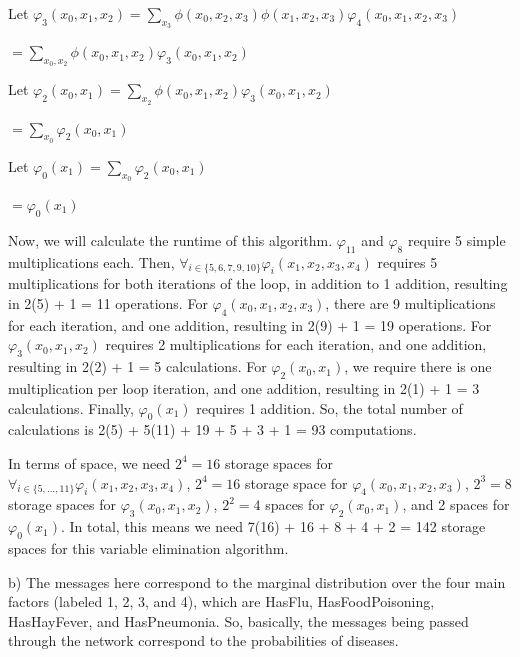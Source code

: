\documentclass[12pt]{article}
\begin{document}
Let $\varphi_3(x_0, x_1, x_2) = \sum_{x_3} \phi(x_0, x_2, x_3)\phi(x_1, x_2, x_3)\varphi_4(x_0, x_1, x_2, x_3)$

$= \sum_{x_0, x_2} \phi(x_0, x_1, x_2)\varphi_3(x_0, x_1, x_2)$

Let $\varphi_2(x_0, x_1) = \sum_{x_2} \phi(x_0, x_1, x_2)\varphi_3(x_0, x_1, x_2)$

$= \sum_{x_0} \varphi_2(x_0, x_1)$

Let $\varphi_0(x_1) = \sum_{x_0} \varphi_2(x_0, x_1)$

$= \varphi_0(x_1)$

Now, we will calculate the runtime of this algorithm. $\varphi_{11}$ and $\varphi_8$ require 5 simple multiplications each. Then, $\forall_{i \in \{5, 6, 7, 9, 10\}}\varphi_{i}(x_1, x_2, x_3, x_4)$ requires 5 multiplications for both iterations of the loop, in addition to 1 addition, resulting in 2(5) + 1 = 11 operations. For $\varphi_4(x_0, x_1, x_2, x_3)$, there are 9 multiplications for each iteration, and one addition, resulting in 2(9) + 1 = 19 operations. For $\varphi_3(x_0, x_1, x_2)$ requires 2 multiplications for each iteration, and one addition, resulting in 2(2) + 1 = 5 calculations. For $\varphi_2(x_0, x_1)$, we require there is one multiplication per loop iteration, and one addition, resulting in 2(1) + 1 = 3 calculations. Finally, $\varphi_0(x_1)$ requires 1 addition. So, the total number of calculations is 2(5) + 5(11) + 19 + 5 + 3 + 1 = 93 computations.

In terms of space, we need $2^4 = 16$ storage spaces for $\forall_{i \in \{5, \dots, 11\}}\varphi_{i}(x_1, x_2, x_3, x_4)$, $2^4 = 16$ storage space for $\varphi_4(x_0, x_1, x_2, x_3)$, $2^3 = 8$ storage spaces for $\varphi_3(x_0, x_1, x_2)$, $2^2 = 4$ spaces for $\varphi_2(x_0, x_1)$, and 2 spaces for $\varphi_0(x_1)$. In total, this means we need 7(16) + 16 + 8 + 4 + 2 = 142 storage spaces for this variable elimination algorithm.

b) The messages here correspond to the marginal distribution over the four main factors (labeled 1, 2, 3, and 4), which are HasFlu, HasFoodPoisoning, HasHayFever, and HasPneumonia. So, basically, the messages being passed through the network correspond to the probabilities of diseases.
\end{document}
